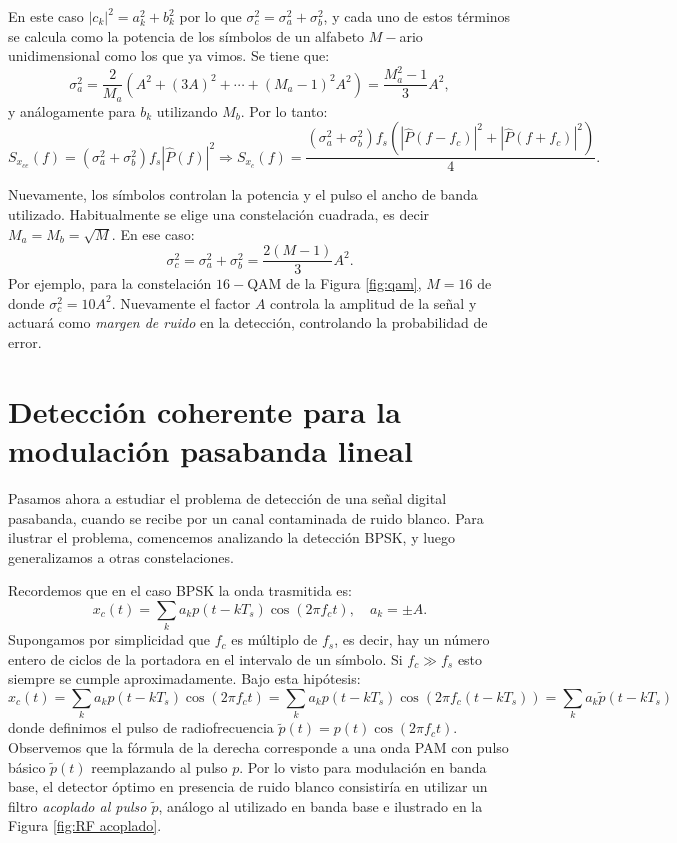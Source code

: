 En este caso $|c_k|^2 = a_k^2 + b_k^2$ por lo que $\sigma_c^2 = \sigma_a^2+\sigma_b^2$, y cada uno de estos términos se calcula como la potencia de los símbolos de un alfabeto $M-$ario unidimensional como los que ya vimos. Se tiene que:
\begin{equation*}
\sigma_a^2 = \frac{2}{M_a}\left(A^2 +
(3A)^2+\cdots+(M_a-1)^2A^2\right) = \frac{M_a^2-1}{3}A^2,    
\end{equation*}
y análogamente para $b_k$ utilizando $M_b$. Por lo tanto:
\begin{equation*}
S_{x_{ce}}(f) = (\sigma_a^2+\sigma_b^2) f_s |\hat{P}(f)|^2 \Longrightarrow S_{x_c}(f) = \frac{(\sigma_a^2+\sigma_b^2)f_s\left(|\hat{P}(f-f_c)|^2 +
|\hat{P}(f+f_c)|^2\right)}{4}.
\end{equation*}

Nuevamente, los símbolos controlan la potencia y el pulso el ancho de banda utilizado. Habitualmente se elige una constelación cuadrada, es decir $M_a = M_b = \sqrt{M}$. En ese caso:
\begin{equation*}
\sigma_c^2 = \sigma_a^2+\sigma_b^2 = \frac{2(M-1)}{3}A^2.
\end{equation*}
Por ejemplo, para la constelación $16-$QAM de la Figura \ref{fig:qam}, $M=16$ de donde $\sigma_c^2 = 10A^2$. Nuevamente el factor $A$ controla la amplitud de la señal y actuará como \emph{margen de ruido} en la detección, controlando la probabilidad de error.

\section{Detección coherente para la modulación pasabanda lineal}\label{sec:deteccion coherente}

Pasamos ahora a estudiar el problema de detección de una señal digital pasabanda, cuando se recibe por un canal contaminada de ruido blanco. Para ilustrar el problema, comencemos analizando la detección BPSK, y luego generalizamos a otras constelaciones.

Recordemos que en el caso BPSK la onda trasmitida es:
\begin{equation*}
 x_c(t)=\sum_k a_kp(t-kT_s)\cos(2\pi f_c t), \quad a_k=\pm A.
\end{equation*}
Supongamos por simplicidad que $f_c$ es múltiplo de $f_s$, es decir, hay un número entero de ciclos de la portadora en el intervalo de un símbolo. Si $f_c\gg f_s$ esto siempre se cumple aproximadamente. Bajo esta hipótesis:
\begin{equation*}
 x_c(t)=\sum_k a_kp(t-kT_s)\cos(2\pi f_c t) = \sum_k a_kp(t-kT_s)\cos(2\pi f_c (t-kT_s))= \sum_k a_k \tilde{p}(t-kT_s)
\end{equation*}
donde definimos el pulso de radiofrecuencia $\tilde{p}(t) = p(t)\cos(2\pi f_c t)$. Observemos que la fórmula de la derecha corresponde a una onda PAM con pulso básico $\tilde{p}(t)$ reemplazando al pulso $p$. Por lo visto para modulación en banda base, el detector óptimo en presencia de ruido blanco consistiría en utilizar un filtro \emph{acoplado al pulso $\tilde{p}$}, análogo al utilizado en banda base e ilustrado en la Figura \ref{fig:RF acoplado}.

